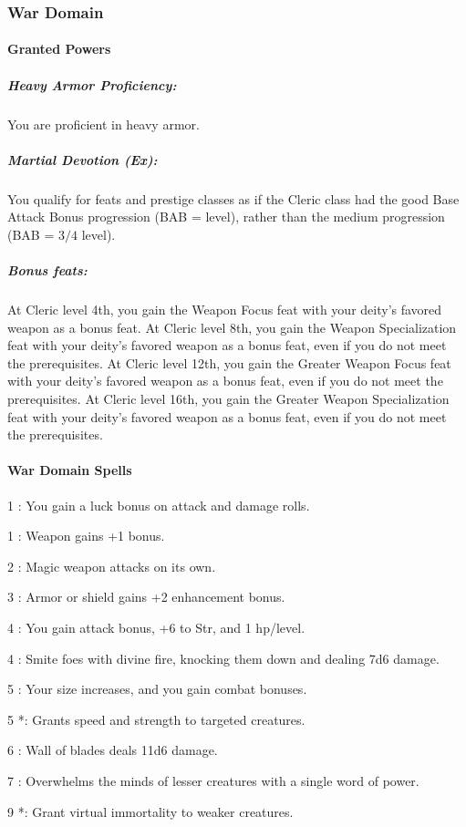 \subsubsection{War Domain}
\paragraph{Granted Powers}
\subparagraph{Heavy Armor Proficiency:}
You are proficient in heavy armor. 
\subparagraph{Martial Devotion (Ex):}
You qualify for feats and prestige classes as if the Cleric class
had the good Base Attack Bonus progression (BAB = level), rather than the medium progression (BAB = $3/4$ level).

\subparagraph{Bonus feats:}
At Cleric level 4th, you gain the Weapon Focus feat with your deity's favored weapon as a bonus feat.
At Cleric level 8th, you gain the Weapon Specialization feat with your deity's favored weapon as a bonus feat, even if you do not meet the prerequisites.
At Cleric level 12th, you gain the Greater Weapon Focus feat with your deity's favored weapon as a bonus feat, even if you do not meet the prerequisites.
At Cleric level 16th, you gain the Greater Weapon Specialization feat with your deity's favored weapon as a bonus feat, even if you do not meet the prerequisites.
\paragraph{War Domain Spells}
\begin{list}{}{\leftmargin=1em}
\item[1] : You gain a luck bonus on attack and damage rolls.
\item[1] : Weapon gains +1 bonus.
\item[2] : Magic weapon attacks on its own.
\item[3] : Armor or shield gains +2 enhancement bonus.
\item[4] : You gain attack bonus, +6 to Str, and 1 hp/level.
\item[4] : Smite foes with divine fire, knocking them down and dealing 7d6 damage.
\item[5] : Your size increases, and you gain combat bonuses.
\item[5] *: Grants speed and strength to targeted creatures.
\item[6] : Wall of blades deals 11d6 damage.
\item[7] : Overwhelms the minds of lesser creatures with a single word of power.
\item[9] *: Grant virtual immortality to weaker creatures.
\end{list}
